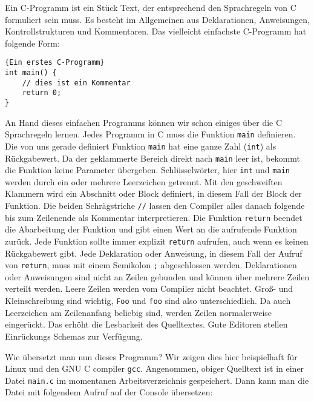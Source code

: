 Ein C-Programm ist ein Stück Text, der entsprechend den Sprachregeln von C formuliert sein muss.
Es besteht im Allgemeinen aus Deklarationen, Anweisungen, Kontrollstrukturen und Kommentaren.
Das vielleicht einfachste C-Programm hat folgende Form:
\begin{lstlisting}{Ein erstes C-Programm}
int main() {
    // dies ist ein Kommentar
    return 0;
}
\end{lstlisting}
An Hand dieses einfachen Programms können wir schon einiges über die C Sprachregeln lernen.
Jedes Programm in C muss die Funktion \texttt{main} definieren. 
Die von uns gerade definiert Funktion \texttt{main} hat eine ganze Zahl (\texttt{int}) als Rückgabewert.
Da der geklammerte Bereich direkt nach \texttt{main} leer ist, bekommt die Funktion keine Parameter übergeben.
Schlüsselwörter, hier \texttt{int} und \texttt{main} werden durch ein oder mehrere Leerzeichen getrennt.
Mit den geschweiften Klammern wird ein Abschnitt oder Block definiert, in diesem Fall der Block der Funktion.
Die beiden Schrägstriche \texttt{//} lassen den Compiler alles danach folgende bis zum Zeilenende als Kommentar interpretieren.
Die Funktion \texttt{return} beendet die Abarbeitung der Funktion und gibt einen Wert an die aufrufende Funktion zurück.
Jede Funktion sollte immer explizit \texttt{return} aufrufen, auch wenn es keinen Rückgabewert gibt.
Jede Deklaration oder Anweisung, in diesem Fall der Aufruf von \texttt{return}, muss mit einem Semikolon \texttt{;} abgeschlossen werden.
Deklarationen oder Anweisungen sind nicht an Zeilen gebunden und können über mehrere Zeilen verteilt werden. 
Leere Zeilen werden vom Compiler nicht beachtet.
Groß- und Kleinschreibung sind wichtig, \texttt{Foo} und \texttt{foo} sind also unterschiedlich.
Da auch Leerzeichen am Zeilenanfang beliebig sind, werden Zeilen normalerweise eingerückt.
Das erhöht die Lesbarkeit des Quelltextes.
Gute Editoren stellen Einrückungs Schemas zur Verfügung.

Wie übersetzt man nun dieses Programm?
Wir zeigen dies hier beispielhaft für Linux und den GNU C compiler \texttt{gcc}.
Angenommen, obiger Quelltext ist in einer Datei \texttt{main.c} im momentanen Arbeitsverzeichnis gespeichert.
Dann kann man die Datei mit folgendem Aufruf auf der Console übersetzen:

\vspace*{0.5cm}
\vspace*{0.5cm}


